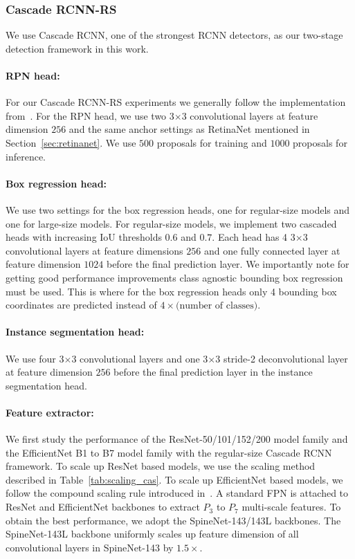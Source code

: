 \documentclass[final]{cvpr}
\newcommand{\ty}[1]{\textcolor{red}{ty: #1}}
\begin{document}
\subsubsection{Cascade RCNN-RS}\label{sec:cascade_rcnn}
We use Cascade RCNN, one of the strongest RCNN detectors, as our two-stage detection framework in this work. 
\paragraph{\bf RPN head:} For our Cascade RCNN-RS experiments we generally follow the implementation from~\cite{cai2018cascade}. For the RPN head, we use two 3$\times$3 convolutional layers at feature dimension $256$ and the same anchor settings as RetinaNet mentioned in Section~\ref{sec:retinanet}. We use $500$ proposals for training and $1000$ proposals for inference.

\paragraph{\bf Box regression head:} We use two settings for the box regression heads, one for regular-size models and one for large-size models. For regular-size models, we implement two cascaded heads with increasing IoU thresholds $0.6$ and $0.7$. Each head has 4 3$\times$3 convolutional layers at feature dimensions $256$ and one fully connected layer at feature dimension $1024$ before the final prediction layer.
We importantly note for getting good performance improvements class agnostic bounding box regression must be used. This is where for the box regression heads only 4 bounding box coordinates are predicted instead of $4 \times \text{(number of classes)}$. 


\paragraph{\bf Instance segmentation head:} We use four 3$\times$3 convolutional layers and one 3$\times$3 stride-2 deconvolutional layer at feature dimension $256$ before the final prediction layer in the instance segmentation head. 

\paragraph{\bf Feature extractor:} We first study the performance of the ResNet-50/101/152/200 model family and the EfficientNet B1 to B7 model family with the regular-size Cascade RCNN framework. To scale up ResNet based models, we use the scaling method described in Table~\ref{tab:scaling_cas}. To scale up EfficientNet based models, we follow the compound scaling rule introduced in~\cite{efficientdet}. A standard FPN is attached to ResNet and EfficientNet backbones to extract $P_3$ to $P_7$ multi-scale features. To obtain the best performance, we adopt the SpineNet-143/143L backbones. The SpineNet-143L backbone uniformly scales up feature dimension of all convolutional layers in SpineNet-143 by $1.5\times$.
\end{document}
